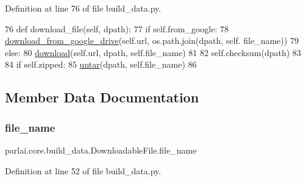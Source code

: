 Definition at line 76 of file build\+\_\+data.\+py.


\begin{DoxyCode}
76     \textcolor{keyword}{def }download\_file(self, dpath):
77         \textcolor{keywordflow}{if} self.from\_google:
78             \hyperlink{namespaceparlai_1_1core_1_1build__data_ac9224da5c4e4ce9d1f4ab05e837c1f45}{download\_from\_google\_drive}(self.url, os.path.join(dpath, self.
      file\_name))
79         \textcolor{keywordflow}{else}:
80             \hyperlink{namespaceparlai_1_1core_1_1build__data_ab74f0e428f05e5d91fa93c8afb367622}{download}(self.url, dpath, self.file\_name)
81 
82         self.checksum(dpath)
83 
84         \textcolor{keywordflow}{if} self.zipped:
85             \hyperlink{namespaceparlai_1_1core_1_1build__data_a4d33f97932682a8513904022d852f3cf}{untar}(dpath, self.file\_name)
86 
\end{DoxyCode}


\subsection{Member Data Documentation}
\mbox{\label{classparlai_1_1core_1_1build__data_1_1DownloadableFile_aa4d0b0712e8e33759cd55024eae74958}} 
\subsubsection{\texorpdfstring{file\+\_\+name}{file\_name}}
{\footnotesize\ttfamily parlai.\+core.\+build\+\_\+data.\+Downloadable\+File.\+file\+\_\+name}



Definition at line 52 of file build\+\_\+data.\+py.

\mbox{\label{classparlai_1_1core_1_1build__data_1_1DownloadableFile_a7217a744f70ba99fac9306eea01c5a08}} 
